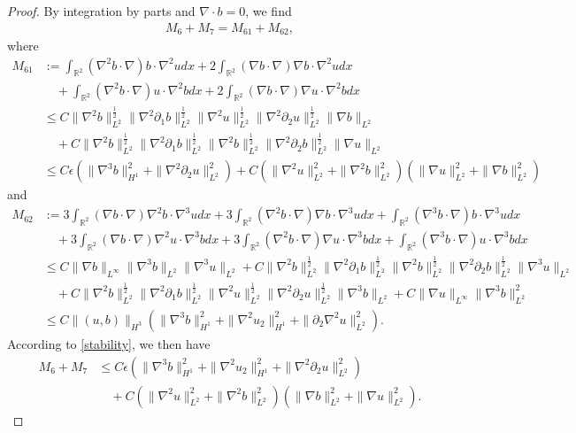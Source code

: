 \documentclass[reqno,11pt]{amsart}
\def\R{\mathbb R}
\numberwithin{Thm}{section}
\begin{document}
\begin{proof}
By integration by parts and $\nabla\cdot b=0$, we find
\begin{align*}
M_{6}+M_{7}=M_{61}+M_{62},
\end{align*}
where \begin{align*}
M_{61}&:=
\int_{\R^2}(\nabla^2b\cdot\nabla) b\cdot\nabla^2udx+
2\int_{\R^2}(\nabla b\cdot\nabla)\nabla b\cdot\nabla^2udx
\nonumber\\
&\quad+\int_{\R^2}(\nabla^2b\cdot\nabla) u\cdot\nabla^2bdx+
2\int_{\R^2}(\nabla b\cdot\nabla)\nabla u\cdot\nabla^2bdx\\
&\leq
C\|\nabla^2 b\|_{L^2}^{\frac{1}{2}}\|\nabla^2\partial_1b\|_{L^2}^{\frac{1}{2}}\|\nabla^2 u\|_{L^2}^{\frac{1}{2}}
\|\nabla^2\partial_2u\|_{L^2}^{\frac{1}{2}}\|\nabla b\|_{L^2}\nonumber\\
&\quad+
C\|\nabla^2 b\|_{L^2}^{\frac{1}{2}}\|\nabla^2\partial_1b\|_{L^2}^{\frac{1}{2}}\|\nabla^2 b\|_{L^2}^{\frac{1}{2}}
\|\nabla^2\partial_2b\|_{L^2}^{\frac{1}{2}}\|\nabla u\|_{L^2}\nonumber\\
&\leq
C\epsilon(\|\nabla^3b\|_{H^1}^2+\|\nabla^2\partial_2u\|_{L^2}^2)+C(\|\nabla^2 u\|_{L^2}^2+\|\nabla^2 b\|_{L^2}^2)(\|\nabla u\|_{L^2}^2+\|\nabla b\|_{L^2}^2)
\end{align*}
and
\begin{align*}
M_{62}&:=
3\int_{\R^2}(\nabla b\cdot\nabla)\nabla^2b\cdot\nabla^3udx+
3\int_{\R^2}(\nabla^2b\cdot\nabla)\nabla b\cdot\nabla^3udx
+\int_{\R^2}(\nabla^3b\cdot\nabla) b\cdot\nabla^3udx\nonumber\\
&\quad+
3\int_{\R^2}(\nabla b\cdot\nabla)\nabla^2u\cdot\nabla^3bdx+
3\int_{\R^2}(\nabla^2b\cdot\nabla)\nabla u\cdot\nabla^3bdx
+\int_{\R^2}(\nabla^3b\cdot\nabla) u\cdot\nabla^3bdx\nonumber\\
&\leq C\|\nabla b\|_{L^\infty}\|\nabla^3b\|_{L^2}\|\nabla^3u\|_{L^2}+
C\|\nabla^2 b\|_{L^2}^{\frac{1}{2}}\|\nabla^2\partial_1b\|_{L^2}^{\frac{1}{2}}\|\nabla^2b\|_{L^2}^{\frac{1}{2}}
\|\nabla^2\partial_2b\|_{L^2}^{\frac{1}{2}}\|\nabla^3u\|_{L^2}\nonumber\\
&\quad+C\|\nabla^2 b\|_{L^2}^{\frac{1}{2}}\|\nabla^2\partial_1b\|_{L^2}^{\frac{1}{2}}\|\nabla^2u\|_{L^2}^{\frac{1}{2}}
\|\nabla^2\partial_2u\|_{L^2}^{\frac{1}{2}}\|\nabla^3b\|_{L^2}+C\|\nabla u\|_{L^\infty}\|\nabla^3b\|_{L^2}^2\nonumber\\
&\leq
C\|(u,b)\|_{H^3}(\|\nabla^3b\|_{H^1}^2+\|\nabla^2u_2\|_{H^1}^2+\|\partial_2\nabla^2u\|_{L^2}^2).
\end{align*}
According to \eqref{stability}, we then have
\begin{align*}
M_{6}+M_7
&\leq C\epsilon(\|\nabla^3b\|_{H^1}^2+\|\nabla^2u_2\|_{H^1}^2+\|\nabla^2\partial_2u\|_{L^2}^2)\nonumber\\
&\quad+C(\|\nabla^2 u\|_{L^2}^2+\|\nabla^2 b\|_{L^2}^2)(\|\nabla b\|_{L^2}^2+\|\nabla u\|_{L^2}^2).
\end{align*}



\end{proof}
\end{document}
